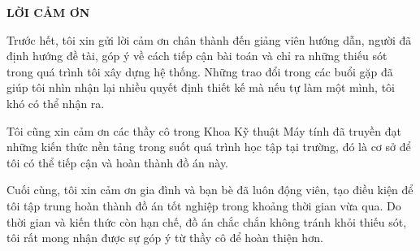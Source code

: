 \documentclass[../DoAn.tex]{subfiles}
\begin{document}
\begin{center}
    \Large{\textbf{LỜI CẢM ƠN}}\\
\end{center}
\vspace{1cm}
Trước hết, tôi xin gửi lời cảm ơn chân thành đến giảng viên hướng dẫn, người đã định hướng đề tài, góp ý về cách tiếp cận bài toán và chỉ ra những thiếu sót trong quá trình tôi xây dựng hệ thống. Những trao đổi trong các buổi gặp đã giúp tôi nhìn nhận lại nhiều quyết định thiết kế mà nếu tự làm một mình, tôi khó có thể nhận ra.

Tôi cũng xin cảm ơn các thầy cô trong Khoa Kỹ thuật Máy tính đã truyền đạt những kiến thức nền tảng trong suốt quá trình học tập tại trường, đó là cơ sở để tôi có thể tiếp cận và hoàn thành đồ án này.

Cuối cùng, tôi xin cảm ơn gia đình và bạn bè đã luôn động viên, tạo điều kiện để tôi tập trung hoàn thành đồ án tốt nghiệp trong khoảng thời gian vừa qua. Do thời gian và kiến thức còn hạn chế, đồ án chắc chắn không tránh khỏi thiếu sót, tôi rất mong nhận được sự góp ý từ thầy cô để hoàn thiện hơn.
\end{document}
